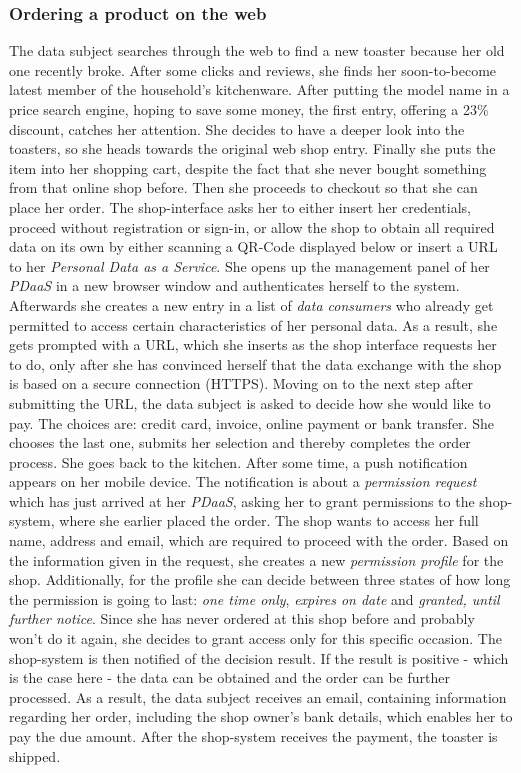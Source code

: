 \documentclass[12pt,english,a4paper,titlepage,cleardoublepage=empty,dottedtoc]{report}
\begin{document}
\subsubsection*{Ordering a product on the
web}\label{ordering-a-product-on-the-web}

The data subject searches through the web to find a new toaster because
her old one recently broke. After some clicks and reviews, she finds her
soon-to-become latest member of the household's kitchenware. After
putting the model name in a price search engine, hoping to save some
money, the first entry, offering a 23\% discount, catches her attention.
She decides to have a deeper look into the toasters, so she heads
towards the original web shop entry. Finally she puts the item into her
shopping cart, despite the fact that she never bought something from
that online shop before. Then she proceeds to checkout so that she can
place her order. The shop-interface asks her to either insert her
credentials, proceed without registration or sign-in, or allow the shop
to obtain all required data on its own by either scanning a QR-Code
displayed below or insert a URL to her \emph{Personal Data as a
Service}. She opens up the management panel of her \emph{PDaaS} in a new
browser window and authenticates herself to the system. Afterwards she
creates a new entry in a list of \emph{data consumers} who already get
permitted to access certain characteristics of her personal data. As a
result, she gets prompted with a URL, which she inserts as the shop
interface requests her to do, only after she has convinced herself that
the data exchange with the shop is based on a secure connection (HTTPS).
Moving on to the next step after submitting the URL, the data subject is
asked to decide how she would like to pay. The choices are: credit card,
invoice, online payment or bank transfer. She chooses the last one,
submits her selection and thereby completes the order process. She goes
back to the kitchen. After some time, a push notification appears on her
mobile device. The notification is about a \emph{permission request}
which has just arrived at her \emph{PDaaS}, asking her to grant
permissions to the shop-system, where she earlier placed the order. The
shop wants to access her full name, address and email, which are
required to proceed with the order. Based on the information given in
the request, she creates a new \emph{permission profile} for the shop.
Additionally, for the profile she can decide between three states of how
long the permission is going to last: \emph{one time only},
\emph{expires on date} and \emph{granted, until further notice}. Since
she has never ordered at this shop before and probably won't do it
again, she decides to grant access only for this specific occasion. The
shop-system is then notified of the decision result. If the result is
positive - which is the case here - the data can be obtained and the
order can be further processed. As a result, the data subject receives
an email, containing information regarding her order, including the shop
owner's bank details, which enables her to pay the due amount. After the
shop-system receives the payment, the toaster is shipped.
\end{document}
